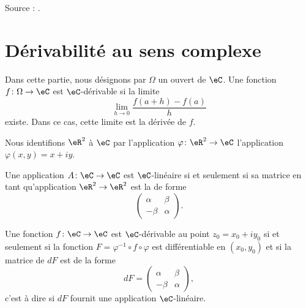 
Source : \cite{Holomorphieus}.

\section{Dérivabilité au sens complexe}

Dans cette partie, nous désignons par \( \Omega\) un ouvert de \( \eC\). Une fonction \( f\colon \Omega\to \eC\) est $\eC$-dérivable si la limite
\begin{equation}
    \lim_{h\to 0} \frac{ f(a+h)-f(a) }{ h }
\end{equation}
existe. Dans ce cas, cette limite est la dérivée de \( f\).

Nous identifions \( \eR^2\) à \( \eC\) par l'application \( \varphi\colon \eR^2\to \eC\) l'application \( \varphi(x,y)=x+iy\).

\begin{lemma}
    Une application \( A\colon \eC\to \eC\) est \( \eC\)-linéaire si et seulement si sa matrice en tant qu'application \( \eR^2\to \eR^2\) est la de forme
    \begin{equation}
        \begin{pmatrix}
            \alpha    &   \beta    \\ 
            -\beta    &   \alpha    
        \end{pmatrix}.
    \end{equation}
\end{lemma}

\begin{proposition}
    Une fonction \( f\colon \eC\to \eC\) est $\eC$-dérivable au point \( z_0=x_0+iy_0\) si et seulement si la fonction \( F=\varphi^{-1}\circ f\circ \varphi\) est différentiable en \( (x_0,y_0)\) et si la matrice de \( dF\) est de la forme
    \begin{equation}
        dF=\begin{pmatrix}
            \alpha    &   \beta    \\ 
            -\beta    &   \alpha    
        \end{pmatrix},
    \end{equation}
    c'est à dire si \( dF\) fournit une application \( \eC\)-linéaire.
\end{proposition}


